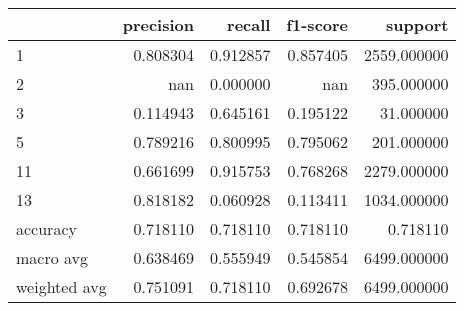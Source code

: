 \begin{tabular}{lrrrr}
\toprule
 & precision & recall & f1-score & support \\
\midrule
1 & 0.808304 & 0.912857 & 0.857405 & 2559.000000 \\
2 & nan & 0.000000 & nan & 395.000000 \\
3 & 0.114943 & 0.645161 & 0.195122 & 31.000000 \\
5 & 0.789216 & 0.800995 & 0.795062 & 201.000000 \\
11 & 0.661699 & 0.915753 & 0.768268 & 2279.000000 \\
13 & 0.818182 & 0.060928 & 0.113411 & 1034.000000 \\
accuracy & 0.718110 & 0.718110 & 0.718110 & 0.718110 \\
macro avg & 0.638469 & 0.555949 & 0.545854 & 6499.000000 \\
weighted avg & 0.751091 & 0.718110 & 0.692678 & 6499.000000 \\
\bottomrule
\end{tabular}

